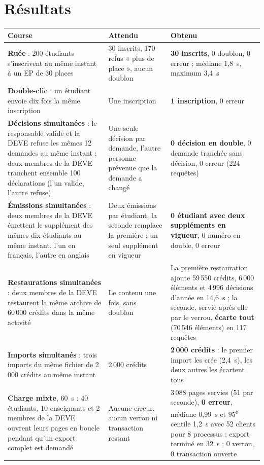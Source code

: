 \documentclass[11pt,a4paper]{article}
\begin{document}
\section{Résultats}

\begin{longtable}{@{}p{4.9cm}p{5.3cm}p{5.3cm}@{}}
\toprule
\textbf{Course} & \textbf{Attendu} & \textbf{Obtenu} \\
\midrule\endhead
\textbf{Ruée} : 200 étudiants s'inscrivent au même instant à un EP de 30 places & 30 inscrits,
  170 refus « plus de place », aucun doublon & \textbf{30 inscrits}, 0 doublon, 0 erreur ;
  médiane 1,8~s, maximum 3,4~s \\
\textbf{Double-clic} : un étudiant envoie dix fois la même inscription & Une inscription &
  \textbf{1 inscription}, 0 erreur \\
\textbf{Décisions simultanées} : le responsable valide et la DEVE refuse les mêmes 12 demandes
  au même instant ; deux membres de la DEVE tranchent ensemble 100 déclarations (l'un valide,
  l'autre refuse) & Une seule décision par demande, l'autre personne prévenue que la demande a
  changé & \textbf{0 décision en double}, 0 demande tranchée sans décision, 0 erreur
  (224 requêtes) \\
\textbf{Émissions simultanées} : deux membres de la DEVE émettent le supplément des mêmes dix
  étudiants au même instant, l'un en français, l'autre en anglais & Deux émissions par étudiant,
  la seconde remplace la première ; un seul supplément en vigueur & \textbf{0 étudiant avec deux
  suppléments en vigueur}, 0 numéro en double, 0 erreur \\
\textbf{Restaurations simultanées} : deux membres de la DEVE restaurent la même archive de
  60\,000 crédits dans la même activité & Le contenu une fois, sans doublon & La première
  restauration ajoute 59\,550 crédits, 6\,000 éléments et 4\,996 décisions d'année en 14,6~s ; la
  seconde, servie après elle par le verrou, \textbf{écarte tout} (70\,546 éléments) en 117
  requêtes \\
\textbf{Imports simultanés} : trois imports du même fichier de 2\,000 crédits au même instant &
  2\,000 crédits & \textbf{2\,000 crédits} : le premier import les crée (2,4~s), les deux autres
  les écartent tous \\
\textbf{Charge mixte}, 60~s : 40 étudiants, 10 enseignants et 2 membres de la DEVE ouvrent leurs
  pages en boucle pendant qu'un export complet est demandé & Aucune erreur, aucun verrou ni
  transaction restant & 3\,088 pages servies (51 par seconde), \textbf{0 erreur}, médiane 0,99~s
  et 95\textsuperscript{e} centile 1,2~s avec 52 clients pour 8 processus ; export terminé
  en 32~s ; 0 verrou, 0 transaction ouverte \\
\bottomrule
\end{longtable}
\end{document}
